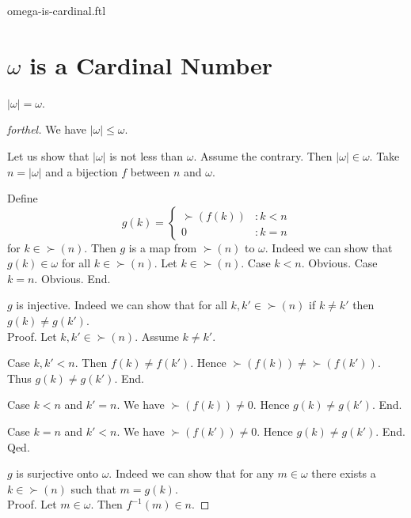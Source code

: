 \documentclass{naproche-library}
\begin{document}
\begin{smodule}{omega-is-cardinal.ftl}

  \section*{$\omega$ is a Cardinal Number}

  \begin{proposition}[forthel,id=SET_THEORY_07_4952029518626816,printid]
    $|\omega| = \omega$.
  \end{proposition}
  \begin{proof}[forthel]
    We have $|\omega| \leq \omega$.

    Let us show that $|\omega|$ is not less than $\omega$.
      Assume the contrary.
      Then $|\omega| \in \omega$.
      Take $n = |\omega|$ and a bijection $f$ between $n$ and $\omega$.

      Define \[ g(k) =
        \begin{cases}
          \succ(f(k)) & : k < n
          \\
          0           & : k = n
        \end{cases} \]
      for $k \in \succ(n)$.
      Then $g$ is a map from $\succ(n)$ to $\omega$.
      Indeed we can show that $g(k) \in \omega$ for all $k \in \succ(n)$.
        Let $k \in \succ(n)$.
        Case $k < n$. Obvious.
        Case $k = n$. Obvious.
      End.

      $g$ is injective.
      Indeed we can show that for all $k, k' \in \succ(n)$ if $k \neq k'$
      then $g(k) \neq g(k')$. \\
      Proof.
        Let $k, k' \in \succ(n)$.
        Assume $k \neq k'$.

        Case $k, k' < n$.
          Then $f(k) \neq f(k')$.
          Hence $\succ(f(k)) \neq \succ(f(k'))$.
          Thus $g(k) \neq g(k')$.
        End.

        Case $k < n$ and $k' = n$.
          We have $\succ(f(k)) \neq 0$.
          Hence $g(k) \neq g(k')$.
        End.

        Case $k = n$ and $k' < n$.
          We have $\succ(f(k')) \neq 0$.
          Hence $g(k) \neq g(k')$.
        End.
      Qed.

      $g$ is surjective onto $\omega$.
      Indeed we can show that for any $m \in \omega$ there exists a $k \in \succ(n)$ such that $m = g(k)$. \\
      Proof.
        Let $m \in \omega$.
        Then $f^{-1}(m) \in n$.


\end{proof}
\end{smodule}
\end{document}
